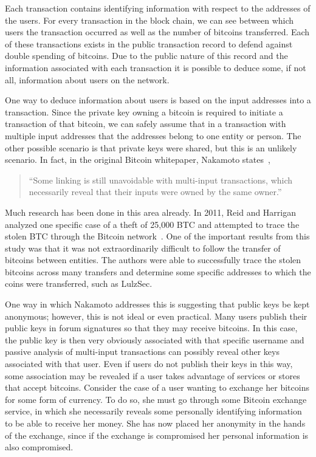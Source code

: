 \documentclass[11pt]{article}
\begin{document}
Each transaction contains identifying information with respect to the addresses
of the users. For every transaction in the block chain, we can see between which
users the transaction occurred as well as the number of bitcoins transferred.
Each of these transactions exists in the public transaction record to defend
against double spending of bitcoins. Due to the public nature of this record and
the information associated with each transaction it is possible to deduce some,
if not all, information about users on the network.

One way to deduce information about users is based on the input addresses into a
transaction. Since the private key owning a bitcoin is required to initiate a
transaction of that bitcoin, we can safely assume that in a transaction
with multiple input addresses that the addresses belong to one
entity or person. The other possible scenario is that private keys were shared,
but this is an unlikely scenario. In fact, in the original Bitcoin whitepaper,
Nakamoto states~\cite{nakamoto08},
\begin{quote}
``Some linking is still unavoidable with multi-input
transactions, which necessarily reveal that their inputs were owned by the same
owner.''
\end{quote}

Much research has been done in this area already. In 2011, Reid and Harrigan
analyzed one specific case of a theft of 25,000 BTC and attempted to trace the
stolen BTC through the Bitcoin network~\cite{reid11}. One of the important
results from this study was that it was not extraordinarily difficult to follow
the transfer of bitcoins between entities. The authors were able to successfully
trace the stolen bitcoins across many transfers and determine some specific
addresses to which the coins were transferred, such as LulzSec.

One way in which Nakamoto addresses this is suggesting that public keys be kept
anonymous; however, this is not ideal or even practical. Many users
publish their public keys in forum signatures so that they may receive bitcoins.
In this case, the public key is then very obviously associated with that
specific username and passive analysis of multi-input transactions can possibly
reveal other keys associated with that user. Even if users do not publish their
keys in this way, some association may be revealed if a user takes advantage of
services or stores that accept bitcoins. Consider the case of a user wanting to
exchange her bitcoins for some form of currency. To do so, she must go through
some Bitcoin exchange service, in which she necessarily reveals some personally
identifying information to be able to receive her money. She has now placed her
anonymity in the hands of the exchange, since if the exchange is compromised
her personal information is also compromised.
\end{document}

